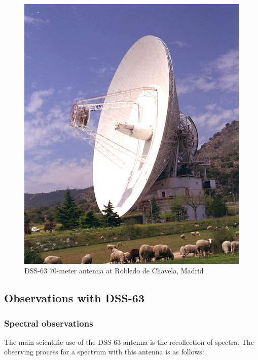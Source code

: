 \begin{figure}[tbp]
\begin{center}
\includegraphics[width=0.75\columnwidth]{fig/DSS-63.jpg}
\caption[DSS-63 70-meter antenna]
{DSS-63 70-meter antenna at Robledo de Chavela, Madrid}
\label{dss63image}
\end{center}
\end{figure}

\subsection{Observations with DSS-63} %
\label{sub:observations_with_dss_63}

\subsubsection{Spectral observations} %
\label{ssub:spectral_observations}

The main scientific use of the DSS-63 antenna is the recollection of
spectra. The observing process for a spectrum with this antenna is as
follows:

